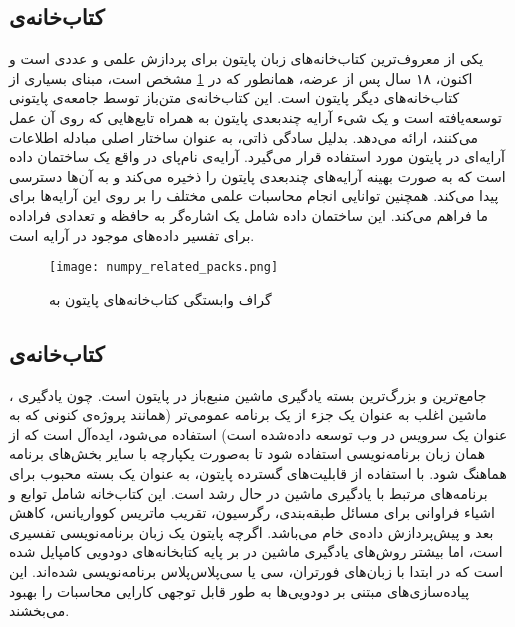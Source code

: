 \subsection{کتاب‌خانه‌ی }
 یکی از معروف‌ترین کتاب‌خانه‌های زبان پایتون برای پردازش علمی و عددی است و اکنون، ۱۸ سال پس از عرضه، همانطور که در \cref{fig:numpy_related_packs}\cite{van2011numpy} مشخص است، مبنای بسیاری از کتاب‌خانه‌های دیگر پایتون است. این کتاب‌خانه‌ی متن‌باز توسط جامعه‌ی پایتونی توسعه‌یافته است و یک شیء آرایه چندبعدی پایتون به همراه تابع‌هایی که روی آن عمل می‌کنند، ارائه می‌دهد.  بدلیل سادگی ذاتی، به عنوان ساختار اصلی مبادله اطلاعات آرایه‌ای در پایتون مورد استفاده قرار می‌گیرد\cite{harris2020array}. آرایه‌ی نام‌پای در واقع یک ساختمان داده است که به صورت بهینه آرایه‌های چند‌بعدی پایتون را ذخیره می‌کند و به آن‌ها دسترسی پیدا می‌کند. همچنین توانایی انجام محاسبات علمی مختلف را بر روی این آرایه‌ها برای ما فراهم می‌کند. این ساختمان داده شامل یک اشاره‌گر به حافظه و تعدادی فراداده برای تفسیر داده‌های موجود در آرایه است\cite{harris2020array, van2011numpy}.

\begin{figure}[!h]
\centerline{\texttt{[image: numpy\_related\_packs.png]}}
\caption{گراف وابستگی کتاب‌خانه‌های پایتون به \cite{van2011numpy}}
\label{fig:numpy_related_packs}
\end{figure}

\subsection{کتاب‌خانه‌ی } 
، جامع‌ترین و بزرگ‌ترین بسته یادگیری ماشین منبع‌باز در پایتون است. چون یادگیری ماشین اغلب به عنوان یک جزء از یک برنامه عمومی‌تر (همانند پروژه‌ی کنونی که به عنوان یک سرویس در وب توسعه داده‌شده است) استفاده می‌شود، ایده‌آل است که از همان زبان برنامه‌نویسی استفاده شود تا به‌صورت یکپارچه با سایر بخش‌های برنامه هماهنگ شود. با استفاده از قابلیت‌های گسترده پایتون،  به عنوان یک بسته محبوب برای برنامه‌های مرتبط با یادگیری ماشین در حال رشد است\cite{hao2019machine}. این کتاب‌خانه شامل توابع و اشیاء فراوانی برای مسائل طبقه‌بندی، رگرسیون، تقریب ماتریس کوواریانس، کاهش بعد و پیش‌پردازش داده‌ی خام می‌باشد\cite{kramer2016scikit}. اگرچه پایتون یک زبان برنامه‌نویسی تفسیری است، اما بیشتر روش‌های یادگیری ماشین در  بر پایه کتابخانه‌های دودویی کامپایل شده است که در ابتدا با زبان‌های فورتران، سی یا سی‌پلاس‌پلاس برنامه‌نویسی شده‌اند. این پیاده‌سازی‌های مبتنی بر دودویی‌ها به طور قابل توجهی کارایی محاسبات را بهبود می‌بخشند\cite{hao2019machine, kramer2016scikit}.

